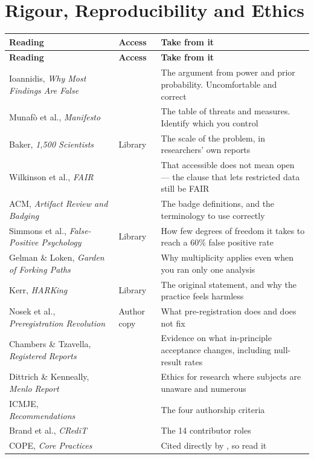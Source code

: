 \section{Rigour, Reproducibility and Ethics}

\begin{center}
\small
\begin{longtable}{@{}L{4.4cm}L{1.8cm}L{7.6cm}@{}}
\toprule
\textbf{Reading} & \textbf{Access} & \textbf{Take from it} \\
\midrule
\endfirsthead
\toprule
\textbf{Reading} & \textbf{Access} & \textbf{Take from it} \\
\midrule
\endhead
\bottomrule
\endfoot
Ioannidis, \emph{Why Most Findings Are False}~\cite{ioannidis2005why}
  & \oa{}
  & The argument from power and prior probability. Uncomfortable and correct \\
Munaf{\`o} et al., \emph{Manifesto}~\cite{munafo2017manifesto}
  & \oa{}
  & The table of threats and measures. Identify which you control \\
Baker, \emph{1,500 Scientists}~\cite{baker2016reproducibility}
  & Library
  & The scale of the problem, in researchers' own reports \\
Wilkinson et al., \emph{FAIR}~\cite{wilkinson2016fair}
  & \oa{}
  & That accessible does not mean open --- the clause that lets restricted data
    still be FAIR \\
ACM, \emph{Artifact Review and Badging}~\cite{acm2020badging}
  & \oa{}
  & The badge definitions, and the terminology to use correctly \\
Simmons et al., \emph{False-Positive Psychology}~\cite{simmons2011false}
  & Library
  & How few degrees of freedom it takes to reach a 60\% false positive rate \\
Gelman \& Loken, \emph{Garden of Forking Paths}~\cite{gelman2013garden}
  & \oa{}
  & Why multiplicity applies even when you ran only one analysis \\
Kerr, \emph{HARKing}~\cite{kerr1998harking}
  & Library
  & The original statement, and why the practice feels harmless \\
Nosek et al., \emph{Preregistration Revolution}~\cite{nosek2018preregistration}
  & Author copy
  & What pre-registration does and does not fix \\
Chambers \& Tzavella, \emph{Registered Reports}~\cite{chambers2022past}
  & \oa{}
  & Evidence on what in-principle acceptance changes, including null-result rates \\
Dittrich \& Kenneally, \emph{Menlo Report}~\cite{dittrich2012menlo}
  & \oa{}
  & Ethics for research where subjects are unaware and numerous \\
ICMJE, \emph{Recommendations}~\cite{icmje2024recommendations}
  & \oa{}
  & The four authorship criteria \\
Brand et al., \emph{CRediT}~\cite{brand2015beyond}
  & \oa{}
  & The 14 contributor roles \\
COPE, \emph{Core Practices}~\cite{cope2019corepractices}
  & \oa{}
  & Cited directly by , so read it \\
\end{longtable}
\end{center}

